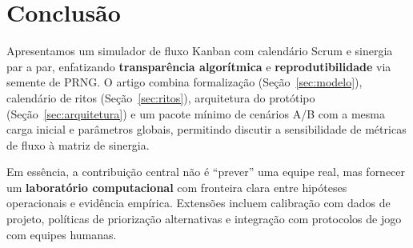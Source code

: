 \section{Conclusão}
\label{sec:conclusao}

Apresentamos um simulador de fluxo Kanban com calendário Scrum e sinergia par a par, enfatizando \textbf{transparência algorítmica} e \textbf{reprodutibilidade} via semente de PRNG. O artigo combina formalização (Seção~\ref{sec:modelo}), calendário de ritos (Seção~\ref{sec:ritos}), arquitetura do protótipo (Seção~\ref{sec:arquitetura}) e um pacote mínimo de cenários A/B com a mesma carga inicial e parâmetros globais, permitindo discutir a sensibilidade de métricas de fluxo à matriz de sinergia.

Em essência, a contribuição central não é ``prever'' uma equipe real, mas fornecer um \textbf{laboratório computacional} com fronteira clara entre hipóteses operacionais e evidência empírica. Extensões incluem calibração com dados de projeto, políticas de priorização alternativas e integração com protocolos de jogo com equipes humanas.
